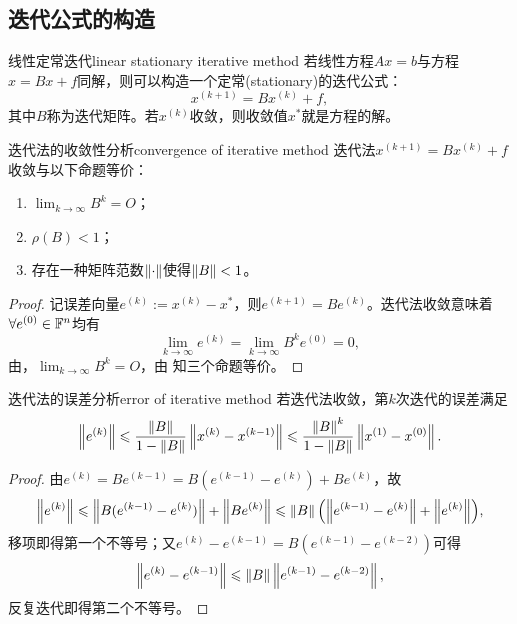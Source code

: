 \subsection{迭代公式的构造}

\begin{theorem}
    {线性定常迭代}{linear stationary iterative method}
    若线性方程$Ax=b$与方程$x=Bx+f$同解，则可以构造一个定常(stationary)的迭代公式：
    \begin{equation}
        x^{(k+1)}=Bx^{(k)}+f,
    \end{equation}
    其中$B$称为迭代矩阵。若$x^{(k)}$收敛，则收敛值$x^*$就是方程的解。
\end{theorem}

\begin{theorem}
    {迭代法的收敛性分析}{convergence of iterative method}
    迭代法$x^{(k+1)}=Bx^{(k)}+f$收敛与以下命题等价：
    \begin{enumerate}
        \item $\lim_{k\to\infty}B^k=O$；
        \item $\rho(B)<1$；
        \item 存在一种矩阵范数$\left\lVert\cdot\right\rVert$使得$\left\lVert B\right\rVert<1$。
    \end{enumerate}
\end{theorem}

\begin{proof}
    记误差向量$e^{(k)}:=x^{(k)}-x^*$，则$e^{(k+1)}=Be^{(k)}$。迭代法收敛意味着$\forall e^{(0)}\in\mathbb F^n$均有
    \[
        \lim_{k\to\infty}e^{(k)}=\lim_{k\to\infty}B^ke^{(0)}=0,
    \]
    由，$\lim_{k\to\infty}B^k=O$，由 知三个命题等价。
\end{proof}

\begin{theorem}
    {迭代法的误差分析}{error of iterative method}
    若迭代法收敛，第$k$次迭代的误差满足
    \begin{equation}
        \left\lVert e^{(k)}\right\rVert\leqslant\frac{\left\lVert B\right\rVert}{1-\left\lVert B\right\rVert}\left\lVert x^{(k)}-x^{(k-1)}\right\rVert\leqslant\frac{\left\lVert B\right\rVert^k}{1-\left\lVert B\right\rVert}\left\lVert x^{(1)}-x^{(0)}\right\rVert.
    \end{equation}
\end{theorem}

\begin{proof}
    由$e^{(k)}=Be^{(k-1)}=B(e^{(k-1)}-e^{(k)})+Be^{(k)}$，故
    \[
        \left\lVert e^{(k)}\right\rVert\leqslant\left\lVert B(e^{(k-1)}-e^{(k)})\right\rVert+\left\lVert Be^{(k)}\right\rVert\leqslant\left\lVert B\right\rVert\Bigl(\left\lVert e^{(k-1)}-e^{(k)}\right\rVert+\left\lVert e^{(k)}\right\rVert\Bigr),
    \]
    移项即得第一个不等号；又$e^{(k)}-e^{(k-1)}=B(e^{(k-1)}-e^{(k-2)})$可得 
    \[
        \left\lVert e^{(k)}-e^{(k-1)}\right\rVert\leqslant\left\lVert B\right\rVert\left\lVert e^{(k-1)}-e^{(k-2)}\right\rVert,
    \]
    反复迭代即得第二个不等号。
\end{proof}

